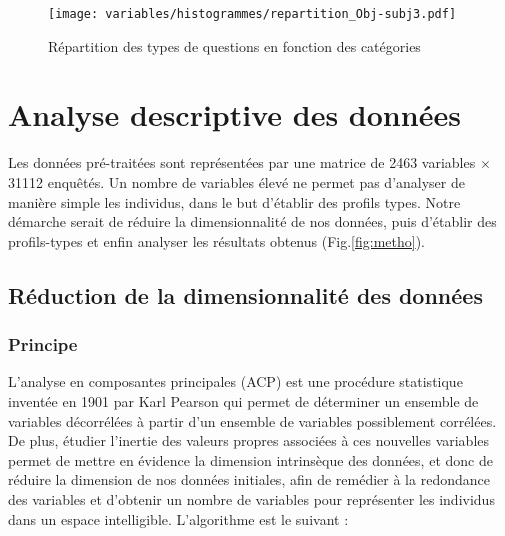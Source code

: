 \documentclass[11pt,fleqn,openany,frenchb]{book} %
\begin{document}
\begin{figure}[!h]
\center
\texttt{[image: variables/histogrammes/repartition\_Obj-subj3.pdf]}
\caption{Répartition des types de questions en fonction des catégories}
\label{fig:repar_objsubj}
\end{figure}

\chapter{Analyse descriptive des données}
Les données pré-traitées sont représentées par une matrice de 2463 variables $\times$ 31112 enquêtés. Un nombre de variables élevé ne permet pas d'analyser de manière simple les individus, dans le but d'établir des profils types. Notre démarche serait de réduire la dimensionnalité de nos données, puis d'établir des profils-types et enfin analyser les résultats obtenus (Fig.\ref{fig:metho}). 
\section{Réduction de la dimensionnalité des données}
\subsection{Principe}
L'analyse en composantes principales (ACP) est une procédure statistique inventée en 1901 par Karl Pearson qui permet de déterminer un ensemble de variables décorrélées à partir d'un ensemble de variables possiblement corrélées. De plus, étudier l'inertie des valeurs propres associées à ces nouvelles variables permet de mettre en évidence la dimension intrinsèque des données, et donc de réduire la dimension de nos données initiales, afin de remédier à la redondance des variables et d'obtenir un nombre de variables pour représenter les individus dans un espace intelligible. L'algorithme est le suivant : \vspace{0.2cm}\par
\end{document}
